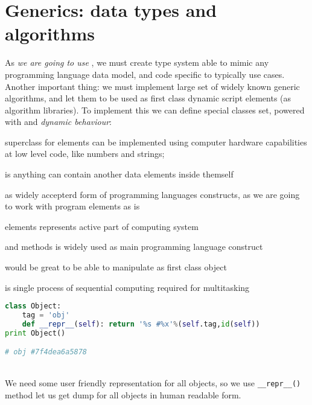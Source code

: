 \chapter{Generics: data types and algorithms}\clearpage

As \emph{we are going to use }, we must create type
system able to mimic any programming language data model, and 
code specific to typically use cases. Another important thing: we must implement
large set of widely known generic algorithms, and let them to be used as
first class dynamic script elements (as algorithm libraries).
To implement this we can define special classes set, powered with
 and \emph{dynamic behaviour}:
\begin{description}[nosep]
\item[Primitive] superclass for elements can be implemented using
computer hardware capabilities at low level code, like numbers and strings;
\item[Collection] is anything can contain another data elements inside themself
\item[AST] as widely accepterd form of programming languages constructs, as
we are going to work with program elements as is
\item[Active] elements represents active part of computing system
\item[Function] and methods is widely used as main programming language
construct
\item[Algorithm] would be great to be able to manipulate as first class object
\item[Thread] is single process of sequential computing required for
multitasking
\end{description}



\begin{lstlisting}[language=Python]
class Object:
    tag = 'obj'
    def __repr__(self): return '%s #%x'%(self.tag,id(self))
print Object()

# obj #7f4dea6a5878
\end{lstlisting}
\\We need some user friendly representation for all objects, so we use
\verb|__repr__()| method let us get dump for all objects in human readable form.

